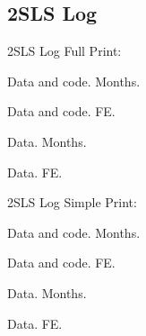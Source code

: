 \documentclass{beamer}
\begin{document}
\begin{frame}{}
\scalebox{0.6}{}
\end{frame}

\begin{frame}{}
\scalebox{0.6}{}
\end{frame}

\begin{frame}{}
\scalebox{0.6}{}
\end{frame}

\subsection{2SLS Log}
\begin{frame}{2SLS Log}
Full Print:

Data and code. Months.

Data and code. FE.

Data. Months.

Data. FE.
\end{frame}

\begin{frame}{}
\scalebox{0.45}{}
\end{frame}

\begin{frame}{}
\scalebox{0.45}{}
\end{frame}

\begin{frame}{}
\scalebox{0.45}{}
\end{frame}

\begin{frame}{}
\scalebox{0.45}{}
\end{frame}

\begin{frame}{2SLS Log}
Simple Print:

Data and code. Months.

Data and code. FE.

Data. Months.

Data. FE.
\end{frame}

\begin{frame}{}
\scalebox{0.6}{}
\end{frame}
\end{document}
